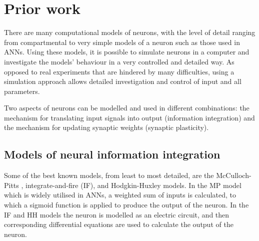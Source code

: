 \documentclass[a4paper,12pt]{report}
\theoremstyle{definition}
\begin{document}
\section{Prior work}


There are many computational models of neurons, with the level of detail ranging from compartmental to very simple models of a neuron such as those used in ANNs. Using these models, it is possible to simulate neurons in a computer and investigate the models' behaviour in a very controlled and detailed way. As opposed to real experiments that are hindered by many difficulties, using a simulation approach allows detailed investigation and control of input and all parameters.

Two aspects of neurons can be modelled and used in different combinations: the mechanism for translating input signals into output (information integration) and the mechanism for updating synaptic weights (synaptic plasticity).


\subsection{Models of neural information integration}
\label{modelsofintegration}

Some of the best known models, from least to most detailed, are the McCulloch-Pitts \cite{mcculloch1943logical}, integrate-and-fire (IF), and Hodgkin-Huxley \cite{hodgkin1952quantitative} models. In the MP model which is widely utilised in ANNs, a weighted sum of inputs is calculated, to which a sigmoid function is applied to produce the output of the neuron. In the IF and HH models the neuron is modelled as an electric circuit, and then corresponding differential equations are used to calculate the output of the neuron.


\end{document}
